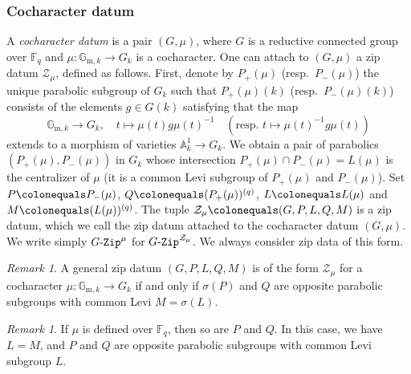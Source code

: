 \documentclass[10pt,a4paper]{article}
\numberwithin{equation}{section}
\theoremstyle{definition}
\theoremstyle{remark}
\newtheorem{rmk}[theorem]{Remark}
\newcommand{\GZip}{\mathop{\text{$G$-{\tt Zip}}}\nolimits}
\newcommand{\Zcal}{{\mathcal Z}}
\renewcommand{\AA}{\mathbb{A}}
\newcommand{\FF}{\mathbb{F}}
\newcommand{\GG}{\mathbb{G}}
\newcommand{\lra}{\longrightarrow}
\begin{document}
\subsubsection{Cocharacter datum} \label{subsec-cochar}
A \emph{cocharacter datum} is a pair $(G,\mu)$, where $G$ is a reductive connected group over $\FF_q$ and $\mu \colon \GG_{\mathrm{m},k}\to G_k$ is a cocharacter. One can attach to $(G,\mu)$ a zip datum $\Zcal_\mu$, defined as follows. First, denote by $P_+(\mu)$ (resp.\ $P_-(\mu)$) the unique parabolic subgroup of $G_k$ such that $P_+(\mu)(k)$ (resp.\ $P_-(\mu)(k)$) consists of the elements $g\in G(k)$ satisfying that the map 
\[
\GG_{\mathrm{m},k} \lra G_{k},\quad  t\longmapsto\mu(t)g\mu(t)^{-1} \quad \left(\textrm{resp.\ } t\longmapsto\mu(t)^{-1}g\mu(t)\right)
\]
extends to a morphism of varieties $\AA_{k}^1\to G_{k}$. We obtain a pair of parabolics $(P_+(\mu),P_{-}(\mu))$ in $G_k$ whose intersection $P_+(\mu)\cap P_-(\mu)=L(\mu)$ is the centralizer of $\mu$ (it is a common Levi subgroup of $P_+(\mu)$ and $P_-(\mu)$). Set $P \colonequals P_-(\mu)$, $Q \colonequals (P_+(\mu))^{(q)}$, $L \colonequals L(\mu)$ and $M \colonequals  (L(\mu))^{(q)}$. The tuple $\Zcal_\mu \colonequals (G,P,L,Q,M)$ is a zip datum, which we call the zip datum attached to the cocharacter datum $(G,\mu)$. We write simply $\GZip^\mu$ for $\GZip^{\Zcal_\mu}$. We always consider zip data of this form.

\begin{rmk}\label{rmk-opposite-cochar}
A general zip datum $(G,P,L,Q,M)$ is of the form $\Zcal_\mu$ for a cocharacter $\mu \colon \GG_{\mathrm{m},k}\to G_k$ if and only if $\sigma(P)$ and $Q$ are opposite parabolic subgroups with common Levi $M=\sigma(L)$.
\end{rmk}

\begin{rmk}\label{rmkmuFp}
If $\mu$ is defined over $\FF_q$, then so are $P$ and $Q$. In this case, we have $L=M$, and $P$ and $Q$ are opposite parabolic subgroups with common Levi subgroup $L$.
\end{rmk}
\end{document}
